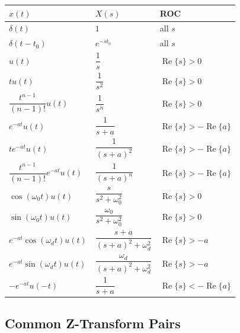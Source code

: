 \documentclass{article}
\begin{document}
\begin{center}
\begin{tabular}{lll}
\toprule
$x(t)$ & $X(s)$ & ROC \\
\midrule
$\delta(t)$ & $1$ & all $s$ \\
$\delta(t-t_0)$ & $e^{-st_0}$ & all $s$ \\
$u(t)$ & $\dfrac{1}{s}$ & $\operatorname{Re}\{s\}>0$ \\
$tu(t)$ & $\dfrac{1}{s^2}$ & $\operatorname{Re}\{s\}>0$ \\
$\dfrac{t^{n-1}}{(n-1)!}u(t)$ & $\dfrac{1}{s^n}$ & $\operatorname{Re}\{s\}>0$ \\
$e^{-at}u(t)$ & $\dfrac{1}{s+a}$ & $\operatorname{Re}\{s\}>-\operatorname{Re}\{a\}$ \\
$t e^{-at}u(t)$ & $\dfrac{1}{(s+a)^2}$ & $\operatorname{Re}\{s\}>-\operatorname{Re}\{a\}$ \\
$\dfrac{t^{n-1}}{(n-1)!}e^{-at}u(t)$ & $\dfrac{1}{(s+a)^n}$ & $\operatorname{Re}\{s\}>-\operatorname{Re}\{a\}$ \\
$\cos(\omega_0 t)u(t)$ & $\dfrac{s}{s^2+\omega_0^2}$ & $\operatorname{Re}\{s\}>0$ \\
$\sin(\omega_0 t)u(t)$ & $\dfrac{\omega_0}{s^2+\omega_0^2}$ & $\operatorname{Re}\{s\}>0$ \\
$e^{-at}\cos(\omega_d t)u(t)$ & $\dfrac{s+a}{(s+a)^2+\omega_d^2}$ & $\operatorname{Re}\{s\}>-a$ \\
$e^{-at}\sin(\omega_d t)u(t)$ & $\dfrac{\omega_d}{(s+a)^2+\omega_d^2}$ & $\operatorname{Re}\{s\}>-a$ \\
$-e^{-at}u(-t)$ & $\dfrac{1}{s+a}$ & $\operatorname{Re}\{s\}<-\operatorname{Re}\{a\}$ \\
\bottomrule
\end{tabular}
\end{center}

\subsection{Common Z-Transform Pairs}
\end{document}
